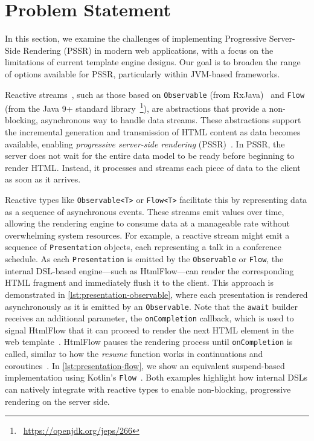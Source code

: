 \section{Problem Statement}

In this section, we examine the challenges of implementing Progressive
Server-Side Rendering (PSSR) in modern web applications, with a focus on the
limitations of current template engine designs. Our goal is to broaden the
range of options available for PSSR, particularly within JVM-based frameworks.

Reactive streams~\cite{ReactiveStreams}, such as those based on
\texttt{Observable} (from RxJava)~\cite{rx-observable} and \texttt{Flow} (from
the Java 9+ standard library~\footnote{~\url{https://openjdk.org/jeps/266}}),
are abstractions that provide a non-blocking, asynchronous
way to handle data streams.
These abstractions support the incremental generation and transmission of HTML
content as data becomes available, enabling \textit{progressive server-side
rendering} (PSSR)~\cite{pssr2005}.
In PSSR, the server does not
wait for the entire data model to be ready before beginning to render HTML.
Instead, it processes and streams each piece of data to the client as soon as
it arrives. 

Reactive types like \texttt{Observable<T>} or \texttt{Flow<T>}
facilitate this by representing data as a sequence of asynchronous events.
These streams emit values over time, allowing the
rendering engine to consume data at a manageable rate without overwhelming
system resources.
For example, a reactive stream might emit a sequence of \texttt{Presentation}
objects, each representing a talk in a conference schedule.
As each \texttt{Presentation} is emitted by the \texttt{Observable}
or \texttt{Flow}, the internal DSL-based engine—such as HtmlFlow—can render the
corresponding HTML fragment and immediately flush it to the client. This
approach is demonstrated in \autoref{lst:presentation-observable}, where each
presentation is rendered asynchronously as it is emitted by an
\texttt{Observable}.
Note that the \texttt{await} builder receives an additional parameter, the
\texttt{onCompletion} callback, which is used to signal HtmlFlow that it can
proceed to render the next HTML element in the web
template~\cite{carvalho2023async}.
HtmlFlow pauses the rendering process until \texttt{onCompletion} is called,
similar to how the \emph{resume} function works in continuations and
coroutines~\cite{coroutines_continuations}.
In \autoref{lst:presentation-flow}, we show an
equivalent suspend-based implementation using Kotlin's \texttt{Flow}~\cite{PSSR-WISE2024}.
Both examples highlight how internal DSLs can natively integrate with reactive types
to enable non-blocking, progressive rendering on the server side.

